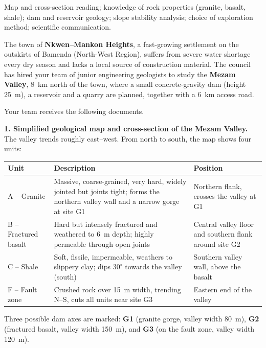\documentclass[11pt]{article}
\newcounter{popsec}
\newcounter{popsub}
\newcommand{\courssub}[1]{%
  \stepcounter{popsub}%
  \par\vspace{9pt}\noindent{\popxbold\fontsize{11.5}{13}\selectfont\color{popink}{\color{poporange}\thepopsec.\thepopsub}\hspace{6pt}#1}\par\nopagebreak\vspace{4pt}
}
\begin{document}
\begin{aretenir}
Map and cross-section reading; knowledge of rock properties (granite, basalt, shale); dam and reservoir geology; slope stability analysis; choice of exploration method; scientific communication.
\end{aretenir}

\courssub{Situation}

The town of \textbf{Nkwen--Mankon Heights}, a fast-growing settlement on the outskirts of Bamenda (North-West Region), suffers from severe water shortage every dry season and lacks a local source of construction material. The council has hired your team of junior engineering geologists to study the \textbf{Mezam Valley}, \SI{8}{km} north of the town, where a small concrete-gravity dam (height \SI{25}{m}), a reservoir and a quarry are planned, together with a \SI{6}{km} access road.

Your team receives the following documents.

\textbf{1. Simplified geological map and cross-section of the Mezam Valley.} The valley trends roughly east--west. From north to south, the map shows four units:

\begin{center}
\begin{tabularx}{\linewidth}{|l|X|X|}\hline
\rowcolor{popblueL} \textbf{Unit} & \textbf{Description} & \textbf{Position} \\ \hline
A -- Granite & Massive, coarse-grained, very hard, widely jointed but joints tight; forms the northern valley wall and a narrow gorge at site G1 & Northern flank, crosses the valley at G1 \\ \hline
B -- Fractured basalt & Hard but intensely fractured and weathered to \SI{6}{m} depth; highly permeable through open joints & Central valley floor and southern flank around site G2 \\ \hline
C -- Shale & Soft, fissile, impermeable, weathers to slippery clay; dips $30^{\circ}$ towards the valley (south) & Southern valley wall, above the basalt \\ \hline
F -- Fault zone & Crushed rock over \SI{15}{m} width, trending N--S, cuts all units near site G3 & Eastern end of the valley \\ \hline
\end{tabularx}
\end{center}

Three possible dam axes are marked: \textbf{G1} (granite gorge, valley width \SI{80}{m}), \textbf{G2} (fractured basalt, valley width \SI{150}{m}), and \textbf{G3} (on the fault zone, valley width \SI{120}{m}).
\end{document}
